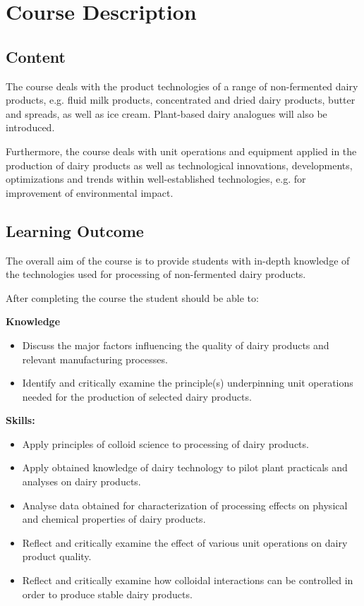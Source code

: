 \chapter*{Course Description}
\setlength{\headheight}{12.71342pt}
\addtolength{\topmargin}{-0.71342pt}


\section*{Content}
The course deals with the product technologies of a range of non-fermented dairy products, e.g. fluid milk products, concentrated and dried dairy products, butter and spreads, as well as ice cream. Plant-based dairy analogues will also be introduced.

Furthermore, the course deals with unit operations and equipment applied in the production of dairy products as well as technological innovations, developments, optimizations and trends within well-established technologies, e.g. for improvement of environmental impact. 

\section*{Learning Outcome}
The overall aim of the course is to provide students with in-depth knowledge of the technologies used for processing of non-fermented dairy products.

\vline

After completing the course the student should be able to:

\textbf{Knowledge}
\begin{itemize}
    \item Discuss the major factors influencing the quality of dairy products and relevant manufacturing processes.
    \item Identify and critically examine the principle(s) underpinning unit operations needed for the production of selected dairy products.
\end{itemize}
\vline

\textbf{Skills:}
\begin{itemize}
    \item Apply principles of colloid science to processing of dairy products.
    \item Apply obtained knowledge of dairy technology to pilot plant practicals and analyses on dairy products.
    \item Analyse data obtained for characterization of processing effects on physical and chemical properties of dairy products.
    \item Reflect and critically examine the effect of various unit operations on dairy product quality.
    \item Reflect and critically examine how colloidal interactions can be controlled in order to produce stable dairy products.
\end{itemize}
\vline

